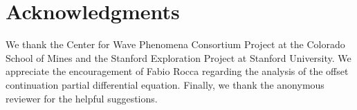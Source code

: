 \section{Acknowledgments}
We thank the Center for Wave Phenomena Consortium Project at the
Colorado School of Mines and the Stanford Exploration Project at
Stanford University. We appreciate the encouragement of Fabio Rocca
regarding the analysis of the offset continuation partial differential
equation. Finally, we thank the anonymous reviewer for the 
helpful suggestions.






